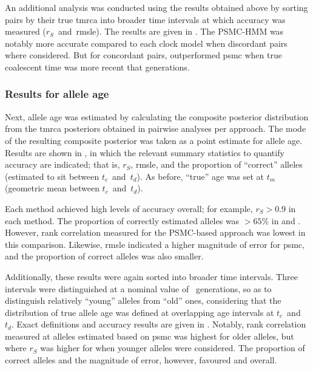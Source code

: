 %

%

An additional analysis was conducted using the results obtained above by sorting pairs by their true \gls{tmrca} into broader time intervals at which accuracy was measured ($r_S$~and~\gls{rmsle}).
The results are given in .
The PSMC-HMM was notably more accurate compared to each clock model when discordant pairs where considered.
But for concordant pairs, \ClockC outperformed \gls{psmc} when true coalescent time was more recent that  generations.



%
\subsubsection{Results for allele age}
%

Next, allele age was estimated by calculating the composite posterior distribution from the \gls{tmrca} posteriors obtained in pairwise analyses per approach.
The mode of the resulting composite posterior was taken as a point estimate for allele age.
Results are shown in , in which the relevant summary statistics to quantify accuracy are indicated; that is, $r_S$, \gls{rmsle}, and the proportion of ``correct'' alleles (estimated to sit between $t_c$~and~$t_d$).
As before, ``true'' age was set at $t_m$ (geometric mean between $t_c$~and~$t_d$).

%

%

Each method achieved high levels of accuracy overall; for example, ${r_S>0.9}$ in each method.
The proportion of correctly estimated alleles was $>65\%$ in \ClockR and \ClockC.
However, rank correlation measured for the PSMC-based approach was lowest in this comparison.
Likewise, \gls{rmsle} indicated a higher magnitude of error for \gls{psmc}, and the proportion of correct alleles was also smaller.

Additionally, these results were again sorted into broader time intervals.
Three intervals were distinguished at a nominal value of ~generations, so as to distinguish relatively ``young'' alleles from ``old'' ones, considering that the distribution of true allele age was defined at overlapping age intervals at $t_c$~and~$t_d$.
Exact definitions and accuracy results are given in .
Notably, rank correlation measured at alleles estimated based on \gls{psmc} was highest for older alleles, but where $r_S$ was higher for \ClockM when younger alleles were considered.
The proportion of correct alleles and the magnitude of error, however, favoured \ClockR and \ClockC overall.

